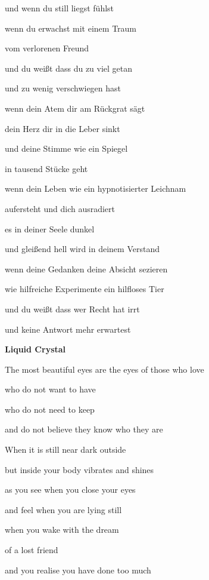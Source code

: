 und wenn du still liegst fühlst


\bigskip

wenn du erwachst mit einem Traum

vom verlorenen Freund

und du weißt dass du zu viel getan

und zu wenig verschwiegen hast


\bigskip

wenn dein Atem dir am Rückgrat sägt

dein Herz dir in die Leber sinkt

und deine Stimme wie ein Spiegel

in tausend Stücke geht


\bigskip

wenn dein Leben wie ein hypnotisierter Leichnam

aufersteht und dich ausradiert

es in deiner Seele dunkel

und gleißend hell wird in deinem Verstand


\bigskip

wenn deine Gedanken deine Absicht sezieren

wie hilfreiche Experimente ein hilfloses Tier

und du weißt dass wer Recht hat irrt

und keine Antwort mehr erwartest


\bigskip


\bigskip

{\bfseries
Liquid Crystal}


\bigskip

The most beautiful eyes are the eyes of those who love

who do not want to have

who do not need to keep

and do not believe they know who they are


\bigskip

When it is still near dark outside

but inside your body vibrates and shines

as you see when you close your eyes

and feel when you are lying still


\bigskip

when you wake with the dream 

of a lost friend

and you realise you have done too much

